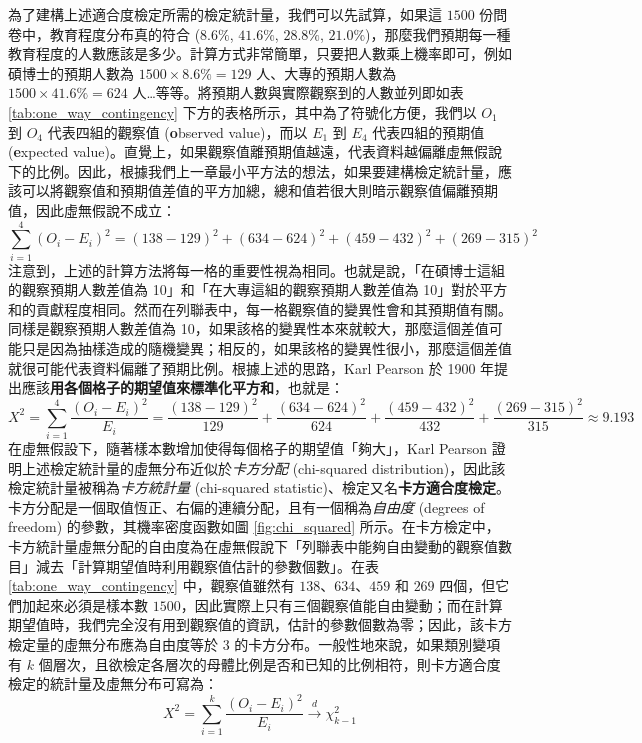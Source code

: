     為了建構上述適合度檢定所需的檢定統計量，我們可以先試算，如果這 $1500$ 份問卷中，教育程度分布真的符合 ($8.6\%$, $41.6\%$, $28.8\%$, $21.0\%$)，那麼我們預期每一種教育程度的人數應該是多少。計算方式非常簡單，只要把人數乘上機率即可，例如碩博士的預期人數為 $1500 \times 8.6\% = 129$ 人、大專的預期人數為 $1500 \times 41.6\% = 624$ 人…等等。將預期人數與實際觀察到的人數並列即如表 \ref{tab:one_way_contingency} 下方的表格所示，其中為了符號化方便，我們以 $O_1$ 到 $O_4$ 代表四組的觀察值 (\textbf{o}bserved value)，而以 $E_1$ 到 $E_4$ 代表四組的預期值 (\textbf{e}xpected value)。直覺上，如果觀察值離預期值越遠，代表資料越偏離虛無假說下的比例。因此，根據我們上一章最小平方法的想法，如果要建構檢定統計量，應該可以將觀察值和預期值差值的平方加總，總和值若很大則暗示觀察值偏離預期值，因此虛無假說不成立：
    \[\sum_{i=1}^4 (O_i - E_i)^2 = (138-129)^2 + (634-624)^2 + (459-432)^2 + (269-315)^2\]
    注意到，上述的計算方法將每一格的重要性視為相同。也就是說，「在碩博士這組的觀察預期人數差值為 10」和「在大專這組的觀察預期人數差值為 10」對於平方和的貢獻程度相同。然而在列聯表中，每一格觀察值的變異性會和其預期值有關。同樣是觀察預期人數差值為 10，如果該格的變異性本來就較大，那麼這個差值可能只是因為抽樣造成的隨機變異；相反的，如果該格的變異性很小，那麼這個差值就很可能代表資料偏離了預期比例。根據上述的思路，Karl Pearson 於 1900 年提出應該\textbf{用各個格子的期望值來標準化平方和}，也就是：
    \[X^2 = \sum_{i=1}^4 \frac{(O_i - E_i)^2}{E_i} = \frac{(138-129)^2}{129} + \frac{(634-624)^2}{624} + \frac{(459-432)^2}{432} + \frac{(269-315)^2}{315} \approx 9.193\]
    在虛無假設下，隨著樣本數增加使得每個格子的期望值「夠大」，Karl Pearson 證明上述檢定統計量的虛無分布近似於\textit{卡方分配} (chi-squared distribution)，因此該檢定統計量被稱為\textit{卡方統計量} (chi-squared statistic)、檢定又名\textbf{卡方適合度檢定}。卡方分配是一個取值恆正、右偏的連續分配，且有一個稱為\textit{自由度} (degrees of freedom) 的參數，其機率密度函數如圖 \ref{fig:chi_squared} 所示。在卡方檢定中，卡方統計量虛無分配的自由度為在虛無假說下「列聯表中能夠自由變動的觀察值數目」減去「計算期望值時利用觀察值估計的參數個數」。在表\ref{tab:one_way_contingency} 中，觀察值雖然有 $138$、$634$、$459$ 和 $269$ 四個，但它們加起來必須是樣本數 $1500$，因此實際上只有三個觀察值能自由變動；而在計算期望值時，我們完全沒有用到觀察值的資訊，估計的參數個數為零；因此，該卡方檢定量的虛無分布應為自由度等於 $3$ 的卡方分布。一般性地來說，如果類別變項有 $k$ 個層次，且欲檢定各層次的母體比例是否和已知的比例相符，則卡方適合度檢定的統計量及虛無分布可寫為：
    \[X^2 = \sum_{i=1}^k \frac{(O_i - E_i)^2}{E_i} \xrightarrow[]{d} \chi^2_{k-1}\]

